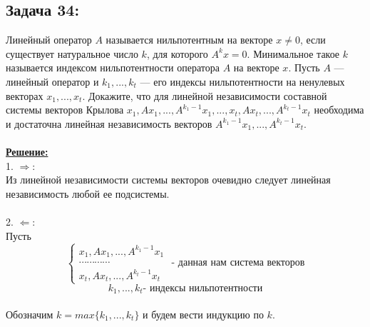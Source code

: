 \documentclass[a4paper,12pt,titlepage,final]{article}
\begin{document}
\subsection*{Задача 34:}
\noindent Линейный оператор $A$ называется нильпотентным на векторе $x \neq 0$, если существует 
натуральное число $k$, для которого $A^k x = 0$. Минимальное такое $k$ называется индексом 
нильпотентности оператора $A$ на векторе $x$. Пусть $A$ — линейный оператор и $k_1, ... , k_t$ — его индексы 
нильпотентности на ненулевых векторах $x_1, ... , x_t$. Докажите, что для линейной независимости составной системы векторов Крылова 
$x_1, Ax_1, ... , A^{k_1 - 1} x_1, ... , x_t , Ax_t, ... , A^{k_t - 1} x_t$ 
необходима и достаточна линейная независимость векторов $A^{k_1 - 1} x_1, ... , A^{k_t - 1} x_t$. \\ \\
\textbf{\underline{Решение:}} \\
1. $\Rightarrow$: \\
Из линейной независимости системы векторов очевидно следует линейная независимость любой ее подсистемы. \\ \\
2. $\Leftarrow$: \\
Пусть 
$$
\begin{cases}
    x_1, Ax_1, ... , A^{k_1 - 1} x_1 \\
    \cdots \cdots \cdots \cdots \\
    x_t , Ax_t, ... , A^{k_t - 1} x_t
\end{cases}
\text{ - данная нам система векторов}$$ $$k_1, ... , k_t \text{- индексы нильпотентности}$$ \\
Обозначим $k = max\{k_1, ... , k_t\}$ и будем вести индукцию по $k$.
\end{document}
